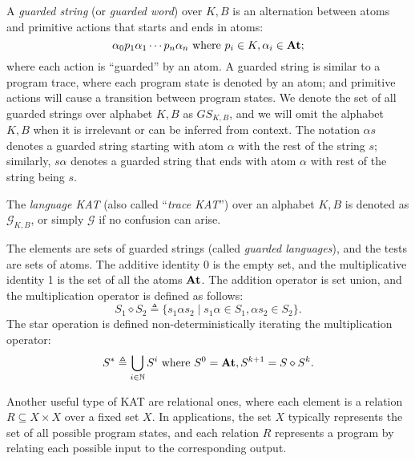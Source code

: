A \emph{guarded string} (or \emph{guarded word}) over \(K, B\) is an alternation 
between atoms and primitive actions that starts and ends in atoms: 
\[ \alpha _{0}p_{1} \alpha _{1}  \cdots  p_{n}  \alpha _{n} \text{ where } p_{i}  \in  K,  \alpha _{i}  \in  \mathbf{At};\] 
where each action is ``guarded'' by an atom.
A guarded string is similar to a program trace, where each program state is denoted by an atom; and primitive actions will cause a transition between program states.
We denote the set of all guarded
strings over alphabet \(K, B\) as \(GS_{K, B}\), and we will omit the alphabet
\(K, B\) when it is irrelevant or can be inferred from context.  The notation
\( \alpha  s\) denotes a guarded string starting with atom \( \alpha \) with the rest of the string
\(s\); similarly, \(s  \alpha \) denotes a guarded string that ends with atom \( \alpha \) with
rest of the string being \(s\).

\begin{definition}
  The \emph{language KAT} (also called ``\emph{trace KAT}'') over an alphabet \(K, B\) is
  denoted as \(\mathcal{G}_{K, B}\), or simply \(\mathcal{G}\) if no confusion can arise.

  The elements are sets of guarded strings (called \emph{guarded languages}), 
  and the tests are sets of atoms.
  The additive identity 0 is the empty set, and the multiplicative identity 1 is
  the set of all the atoms \(\mathbf{At}\).  The addition operator is set union, and the
  multiplication operator is defined as follows:
    \[S_{1}  \diamond  S_{2}  \triangleq  \{s_{1}  \alpha  s_{2}  \mid  s_{1}  \alpha   \in  S_{1},  \alpha  s_{2}  \in  S_{2}\}.\]
    The star operation is defined non-deterministically 
    iterating the multiplication operator:
    \[S^*  \triangleq   \bigcup _{i  \in  \mathbb{N}} S^i \text{ where } S^0 = \mathbf{At}, S^{k+1} = S  \diamond  S^k.\]
\end{definition}

Another useful type of KAT are relational ones, where each element is a relation
\(R  \subseteq  X  \times  X\) over a fixed set \(X\).  In applications, the set $X$ typically
represents the set of all possible program states, and each relation $R$
represents a program by relating each possible input to the corresponding
output.

